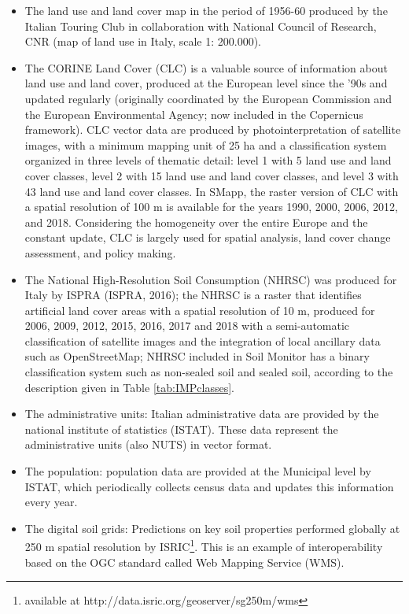 \documentclass[APA,LATO1COL,doublespace]{WileyNJD-v2}
\begin{document}
\begin{itemize}
    \item The land use and land cover map in the period of 1956-60 produced by the Italian Touring Club in collaboration with National Council of Research, CNR (map of land use in Italy, scale 1: 200.000).
    \item The CORINE Land Cover (CLC) is a valuable source of information about land use and land cover, produced at the European level since the '90s and updated regularly (originally coordinated by the European Commission and the European Environmental Agency; now included in the Copernicus framework).
    CLC vector data are produced by photointerpretation of satellite images, with a minimum mapping unit of 25 ha and a classification system organized in three levels of thematic detail: level 1 with 5 land use and land cover classes, level 2 with 15 land use and land cover classes, and level 3 with 43 land use and land cover classes. 
    In SMapp, the raster version of CLC with a spatial resolution of 100 m is available for the years 1990, 2000, 2006, 2012, and 2018. Considering the homogeneity over the entire Europe and the constant update, CLC is largely used for spatial analysis, land cover change assessment, and policy making.
    \item The National High-Resolution Soil Consumption (NHRSC) was produced for Italy by ISPRA (ISPRA, 2016); the NHRSC is a raster that identifies artificial land cover areas with a spatial resolution of 10 m, produced for 2006, 2009, 2012, 2015, 2016, 2017 and 2018 with a semi-automatic classification of satellite images and the integration of local ancillary data such as OpenStreetMap; NHRSC included in Soil Monitor has a binary classification system such as non-sealed soil and sealed soil, according to the description given in Table \ref{tab:IMPclasses}.
    \item The administrative units: Italian administrative data are provided by the national institute of statistics (ISTAT). 
    These data represent the administrative units (also NUTS) in vector format.
    \item The population: population data are provided at the Municipal level by ISTAT, which periodically collects census data and updates this information every year. 
    \item The digital soil grids: Predictions on key soil properties performed globally at 250 m spatial resolution by ISRIC\footnote{available at http://data.isric.org/geoserver/sg250m/wms}. This is an example of interoperability based on the OGC standard called Web Mapping Service (WMS).
\end{itemize}
\end{document}
